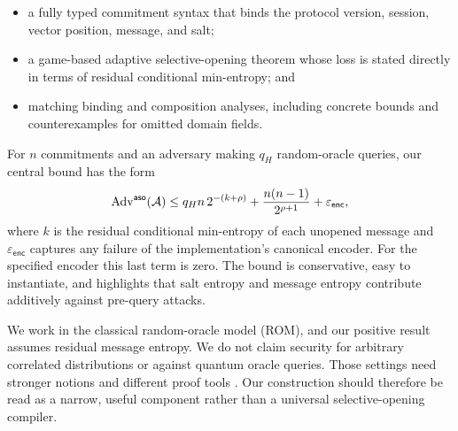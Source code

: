 \begin{itemize}
  \item a fully typed commitment syntax that binds the protocol version,
        session, vector position, message, and salt;
  \item a game-based adaptive selective-opening theorem whose loss is stated
        directly in terms of residual conditional min-entropy; and
  \item matching binding and composition analyses, including concrete bounds
        and counterexamples for omitted domain fields.
\end{itemize}

For $n$ commitments and an adversary making $q_H$ random-oracle queries, our
central bound has the form
\begin{equation}
  \operatorname{Adv}^{\mathsf{aso}}(\mathcal{A})
  \leq q_Hn\,2^{-(k+\rho)}
      + \frac{n(n-1)}{2^{\rho+1}}
      + \varepsilon_{\mathsf{enc}},
  \label{eq:informal-bound}
\end{equation}
where $k$ is the residual conditional min-entropy of each unopened message and
$\varepsilon_{\mathsf{enc}}$ captures any failure of the implementation's
canonical encoder.  For the specified encoder this last term is zero.  The
bound is conservative, easy to instantiate, and highlights that salt entropy
and message entropy contribute additively against pre-query attacks.

 We work in the classical random-oracle model (ROM), and our
positive result assumes residual message entropy.  We do not claim security
for arbitrary correlated distributions or against quantum oracle queries.
Those settings need stronger notions and different proof tools
\cite{CanettiEtAl1996,Unruh2015}.  Our construction should therefore be read as
a narrow, useful component rather than a universal selective-opening compiler.
